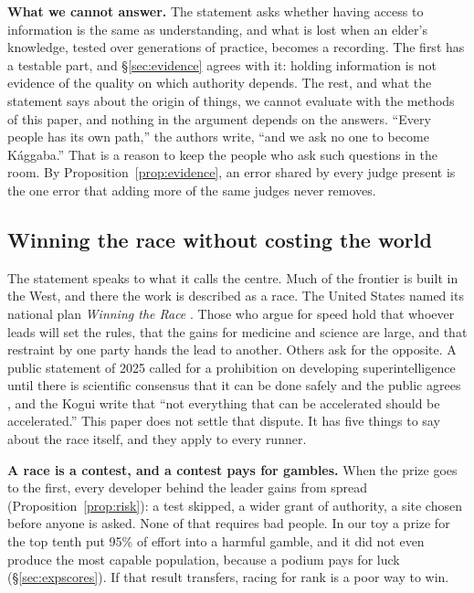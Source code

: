 \documentclass[10pt,twocolumn,letterpaper]{article}
\theoremstyle{definition}
\newcommand{\para}[1]{\smallskip\noindent\textbf{#1}\enspace}
\newcommand{\ScWar}{95}
\begin{document}
\para{What we cannot answer.} The statement asks whether having access to information is the same as understanding, and what is lost when an elder's knowledge, tested over generations of practice, becomes a recording. The first has a testable part, and \S\ref{sec:evidence} agrees with it: holding information is not evidence of the quality on which authority depends. The rest, and what the statement says about the origin of things, we cannot evaluate with the methods of this paper, and nothing in the argument depends on the answers. ``Every people has its own path,'' the authors write, ``and we ask no one to become K\'aggaba.'' That is a reason to keep the people who ask such questions in the room. By Proposition~\ref{prop:evidence}, an error shared by every judge present is the one error that adding more of the same judges never removes.

\subsection{Winning the race without costing the world}
\label{sec:race}

The statement speaks to what it calls the centre. Much of the frontier is built in the West, and there the work is described as a race. The United States named its national plan \emph{Winning the Race} \cite{actionplan}. Those who argue for speed hold that whoever leads will set the rules, that the gains for medicine and science are large, and that restraint by one party hands the lead to another. Others ask for the opposite. A public statement of 2025 called for a prohibition on developing superintelligence until there is scientific consensus that it can be done safely and the public agrees \cite{flistatement}, and the Kogui write that ``not everything that can be accelerated should be accelerated.'' This paper does not settle that dispute. It has five things to say about the race itself, and they apply to every runner.

\para{A race is a contest, and a contest pays for gambles.} When the prize goes to the first, every developer behind the leader gains from spread (Proposition~\ref{prop:risk}): a test skipped, a wider grant of authority, a site chosen before anyone is asked. None of that requires bad people. In our toy a prize for the top tenth put \ScWar\% of effort into a harmful gamble, and it did not even produce the most capable population, because a podium pays for luck (\S\ref{sec:expscores}). If that result transfers, racing for rank is a poor way to win.
\end{document}
